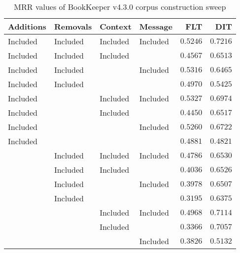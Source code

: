 
\begin{table}
\begin{spacing}{1.2}
\centering
\caption{MRR values of BookKeeper v4.3.0 corpus construction sweep}
\label{table:bookkeeper_corpus_sweep}
\vspace{0.2em}
\begin{tabular}{llll|rr}
\toprule
Additions &  Removals &   Context &   Message & FLT &        DIT \\
\midrule
 Included &  Included &  Included &  Included &         $0.5246$ & $\bm{0.7216}$ \\
 \myrowcolor Included &  Included &  Included &           &         $0.4567$ &      $0.6513$ \\
 Included &  Included &           &  Included &         $0.5316$ &      $0.6465$ \\
 Included &  Included &           &           &         $0.4970$ &      $0.5425$ \\
 Included &           &  Included &  Included &    $\bm{0.5327}$ &      $0.6974$ \\
 Included &           &  Included &           &         $0.4450$ &      $0.6517$ \\
 Included &           &           &  Included &         $0.5260$ &      $0.6722$ \\
 Included &           &           &           &         $0.4881$ &      $0.4821$ \\
          &  Included &  Included &  Included &         $0.4786$ &      $0.6530$ \\
          &  Included &  Included &           &         $0.4036$ &      $0.6526$ \\
          &  Included &           &  Included &         $0.3978$ &      $0.6507$ \\
          &  Included &           &           &         $0.3195$ &      $0.6375$ \\
          &           &  Included &  Included &         $0.4968$ &      $0.7114$ \\
          &           &  Included &           &         $0.3366$ &      $0.7057$ \\
          &           &           &  Included &         $0.3826$ &      $0.5132$ \\
\bottomrule
\end{tabular}

\end{spacing}
\end{table}

